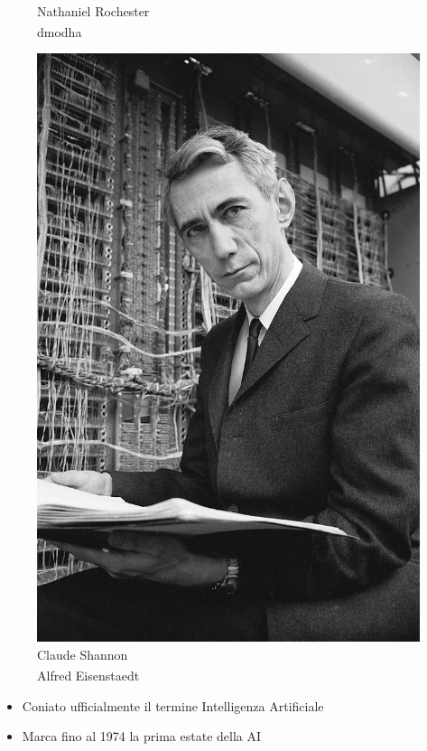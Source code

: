 \begin{frame}[t]
{\begin{minipage}[t]{\textwidth}
\begin{minipage}[t]{0.24\textwidth}
\begin{figure}[ht]
				{\tiny\\Nathaniel Rochester\\\textsuperscript{\textcopyright}dmodha}
			\end{figure}
		\end{minipage}
		\begin{minipage}[t]{0.24\textwidth}
			\centering
			\begin{figure}[ht]
				\includegraphics[width=.6\textwidth]{img/Roberts-Claude-Shannon.png}
				{\tiny\\Claude Shannon\\\textsuperscript{\textcopyright}Alfred Eisenstaedt}
			\end{figure}
		\end{minipage}
	\end{minipage}
    \begin{itemize}[leftmargin=10pt,align=right]
		\onslide<2->\item[\alert{\faHandORight}] Coniato ufficialmente il termine \alert{Intelligenza Artificiale}
		\onslide<3->\item[\alert{\faHandORight}] Marca fino al 1974 la \alert{prima estate della AI}
	\end{itemize}
}
\end{frame}
%
